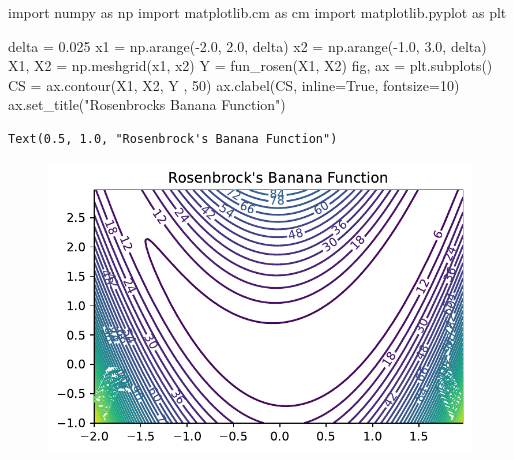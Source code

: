 \documentclass[
  letterpaper,
  DIV=11,
  numbers=noendperiod]{scrreprt}
\newenvironment{Shaded}{\begin{snugshade}}{\end{snugshade}}
\newcommand{\DecValTok}[1]{\textcolor[rgb]{0.68,0.00,0.00}{#1}}
\newcommand{\FloatTok}[1]{\textcolor[rgb]{0.68,0.00,0.00}{#1}}
\newcommand{\ImportTok}[1]{\textcolor[rgb]{0.00,0.46,0.62}{#1}}
\newcommand{\NormalTok}[1]{\textcolor[rgb]{0.00,0.23,0.31}{#1}}
\newcommand{\OperatorTok}[1]{\textcolor[rgb]{0.37,0.37,0.37}{#1}}
\newcommand{\StringTok}[1]{\textcolor[rgb]{0.13,0.47,0.30}{#1}}
\newcommand{\VariableTok}[1]{\textcolor[rgb]{0.07,0.07,0.07}{#1}}
\begin{document}
\begin{Shaded}
\begin{Highlighting}[]
\ImportTok{import}\NormalTok{ numpy }\ImportTok{as}\NormalTok{ np}
\ImportTok{import}\NormalTok{ matplotlib.cm }\ImportTok{as}\NormalTok{ cm}
\ImportTok{import}\NormalTok{ matplotlib.pyplot }\ImportTok{as}\NormalTok{ plt}

\NormalTok{delta }\OperatorTok{=} \FloatTok{0.025}
\NormalTok{x1 }\OperatorTok{=}\NormalTok{ np.arange(}\OperatorTok{{-}}\FloatTok{2.0}\NormalTok{, }\FloatTok{2.0}\NormalTok{, delta)}
\NormalTok{x2 }\OperatorTok{=}\NormalTok{ np.arange(}\OperatorTok{{-}}\FloatTok{1.0}\NormalTok{, }\FloatTok{3.0}\NormalTok{, delta)}
\NormalTok{X1, X2 }\OperatorTok{=}\NormalTok{ np.meshgrid(x1, x2)}
\NormalTok{Y }\OperatorTok{=}\NormalTok{ fun\_rosen(X1, X2)}
\NormalTok{fig, ax }\OperatorTok{=}\NormalTok{ plt.subplots()}
\NormalTok{CS }\OperatorTok{=}\NormalTok{ ax.contour(X1, X2, Y , }\DecValTok{50}\NormalTok{)}
\NormalTok{ax.clabel(CS, inline}\OperatorTok{=}\VariableTok{True}\NormalTok{, fontsize}\OperatorTok{=}\DecValTok{10}\NormalTok{)}
\NormalTok{ax.set\_title(}\StringTok{"Rosenbrock\textquotesingle{}s Banana Function"}\NormalTok{)}
\end{Highlighting}
\end{Shaded}

\begin{verbatim}
Text(0.5, 1.0, "Rosenbrock's Banana Function")
\end{verbatim}

\begin{figure}[H]

{\centering \includegraphics{005_num_rsm_files/figure-pdf/cell-3-output-2.pdf}

}

\end{figure}
\end{document}
